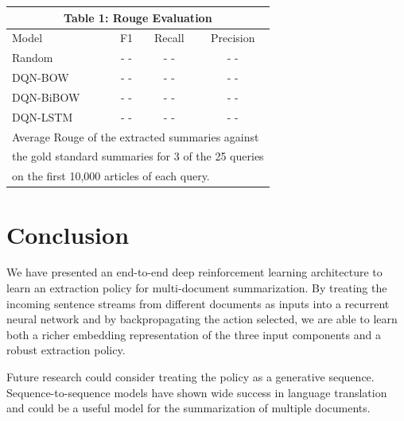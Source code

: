 \documentclass[12pt]{article}
\begin{document}
\begin{center}
\begin{tabular}{  l | c | c | c  }
	\multicolumn{4}{c}{\textbf{Table 1}: Rouge Evaluation} \\
	\hline
	Model  & F1 & Recall & Precision  \\ \hline \hline
	Random  & \color{ red} - - & \color{ red} - -  & \color{ red} - -\\ 
	DQN-BOW  & \color{ red} - - & \color{ red} - -  & \color{ red} - -\\
	DQN-BiBOW  & \color{ red} - - & \color{ red} - -  & \color{ red} - -\\
	DQN-LSTM  & \color{ red}  - - & \color{ red} - -  & \color{ red} - -\\ \hline
	\hline
	\multicolumn{4}{l}{\footnotesize Average Rouge of the extracted summaries against} \\
	\multicolumn{4}{l}{\footnotesize the gold standard summaries for 3 of the 25 queries} \\
	\multicolumn{4}{l}{\footnotesize  on the first 10,000 articles of each query.} \\
	\hline
\end{tabular}
\end{center}

\section{Conclusion}
We have presented an end-to-end deep reinforcement learning architecture to learn an extraction policy for multi-document summarization. By treating the incoming sentence streams from different documents as inputs into a recurrent neural network and by backpropagating the action selected, we are able to learn both a richer embedding representation of the three input components and a robust extraction policy. 

Future research could consider treating the policy as a generative sequence. Sequence-to-sequence models \cite{sutskever2014sequence} have shown wide success in language translation and could be a useful model for the summarization of multiple documents. 


\end{document}
